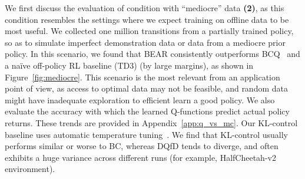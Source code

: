 We first discuss the evaluation of condition with ``mediocre'' data \textbf{(2)}, as this condition resembles the settings where we expect training on offline data to be most useful. We collected one million transitions from a partially trained policy, so as to simulate imperfect demonstration data or data from a mediocre prior policy. In this scenario, we found that BEAR consistently outperforms BCQ~\cite{fujimoto2018off} and a na\"ive off-policy RL baseline (TD3) (by large margins), as shown in Figure~\ref{fig:mediocre}. This scenario is the most relevant from an application point of view, as access to optimal data may not be feasible, and random data might have inadequate exploration to efficient learn a good policy. We also evaluate the accuracy with which the learned Q-functions predict actual policy returns. These trends are provided in Appendix~\ref{app:q_vs_mc}. 
Our KL-control baseline uses automatic temperature tuning~\citep{haarnoja2018sac}. We find that KL-control usually performs similar or worse to BC, whereas DQfD tends to diverge, and often exhibits a huge variance across different runs (for example, HalfCheetah-v2 environment).  

